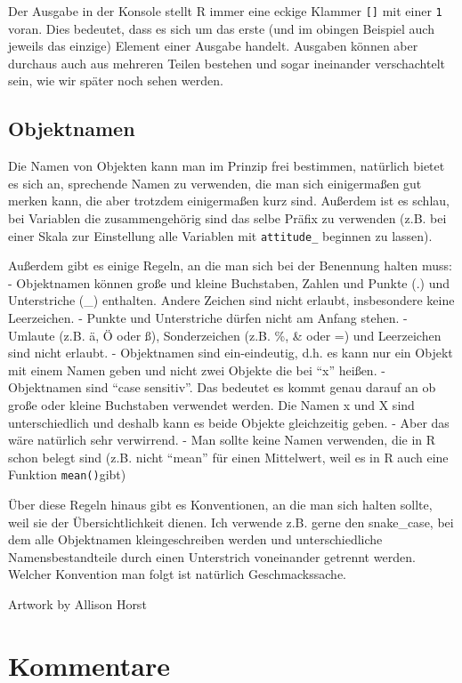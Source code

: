 \documentclass[
]{book}
\begin{document}
Der Ausgabe in der Konsole stellt R immer eine eckige Klammer \texttt{{[}{]}} mit einer \texttt{1} voran. Dies bedeutet, dass es sich um das erste (und im obingen Beispiel auch jeweils das einzige) Element einer Ausgabe handelt. Ausgaben können aber durchaus auch aus mehreren Teilen bestehen und sogar ineinander verschachtelt sein, wie wir später noch sehen werden.

\hypertarget{objektnamen}{%
\subsection{Objektnamen}\label{objektnamen}}

Die Namen von Objekten kann man im Prinzip frei bestimmen, natürlich bietet es sich an, sprechende Namen zu verwenden, die man sich einigermaßen gut merken kann, die aber trotzdem einigermaßen kurz sind. Außerdem ist es schlau, bei Variablen die zusammengehörig sind das selbe Präfix zu verwenden (z.B. bei einer Skala zur Einstellung alle Variablen mit \texttt{attitude\_} beginnen zu lassen).

Außerdem gibt es einige Regeln, an die man sich bei der Benennung halten muss:
- Objektnamen können große und kleine Buchstaben, Zahlen und Punkte (.) und Unterstriche (\_) enthalten. Andere Zeichen sind nicht erlaubt, insbesondere keine Leerzeichen.
- Punkte und Unterstriche dürfen nicht am Anfang stehen.
- Umlaute (z.B. ä, Ö oder ß), Sonderzeichen (z.B. \%, \& oder =) und Leerzeichen sind nicht erlaubt.
- Objektnamen sind ein-eindeutig, d.h. es kann nur ein Objekt mit einem Namen geben und nicht zwei Objekte die bei ``x'' heißen.
- Objektnamen sind ``case sensitiv''. Das bedeutet es kommt genau darauf an ob große oder kleine Buchstaben verwendet werden. Die Namen x und X sind unterschiedlich und deshalb kann es beide Objekte gleichzeitig geben. - Aber das wäre natürlich sehr verwirrend.
- Man sollte keine Namen verwenden, die in R schon belegt sind (z.B. nicht ``mean'' für einen Mittelwert, weil es in R auch eine Funktion \texttt{mean()}gibt)

Über diese Regeln hinaus gibt es Konventionen, an die man sich halten sollte, weil sie der Übersichtlichkeit dienen. Ich verwende z.B. gerne den snake\_case, bei dem alle Objektnamen kleingeschreiben werden und unterschiedliche Namensbestandteile durch einen Unterstrich voneinander getrennt werden. Welcher Konvention man folgt ist natürlich Geschmackssache.

Artwork by Allison Horst

\hypertarget{kommentare}{%
\section{Kommentare}\label{kommentare}}
\end{document}
